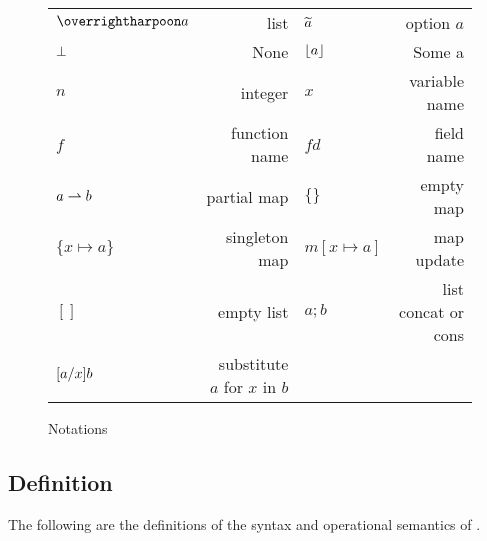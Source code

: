 \begin{figure}[!htbp]
\begin{center}
  \begin{tabularx}{\columnwidth}{lRlR}
    $\ls{a}$ & list &
    $\option{a}$ & option $a$ \\
    $\None$ & None &
    $\Some{a}$ & Some a \\
    $n$ & integer &
    $x$ & variable name \\
    $f$ & function name &
    $fd$ & field name \\
    $a\sympartial b$ & partial map & $\{\}$ & empty map \\
    $\{x\mapsto a\}$ & singleton map & $m[x\mapsto a]$ & map update \\
    $[]$ & empty list & $a;b$ & list concat or cons \\
    $\subst{x}{a}{b}$ & substitute $a$ for $x$ in $b$ & & \\
  \end{tabularx}
\end{center}
\caption{Notations}
\label{fig:notations}
\end{figure}

\subsection{\cstar Definition}

The following are the definitions of the syntax and operational semantics of \cstar.

